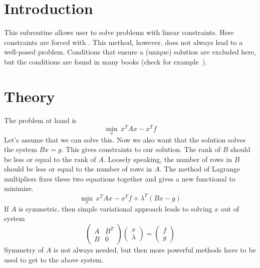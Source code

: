 \noindent
{}
\begin{versiona}

\section{Introduction}
This subroutine allows user to solve problems with linear constraints.
Here constraints are forced with . This method,
however, does not always lead to a well-posed problem. Conditions that ensure
a (unique) solution are excluded here, but the conditions are found in many
books (check for example~\cite{c:girault}).  

\section{Theory}
The problem at hand is
\begin{equation}\label{e:problem}
\min_x \, x^T A x - x^T f
\end{equation}
Let's assume that we can solve this. Now we also want that the solution
solves the system $Bx = g$. This gives constraints to our solution.
The rank of $B$ should be less or equal to the rank of $A$.
Loosely speaking, the number of rows in $B$ should be less or equal to the
number of rows in $A$. The method of Lagrange multipliers fixes these two
equations together and gives a new functional to minimize.
\begin{equation}
\min_x \, x^T A x - x^T f +\lambda^T ( Bx-g )
\end{equation}
If $A$ is symmetric, then simple variational approach leads to solving
$x$ out of system
\begin{equation}
\begin{pmatrix}
A & B^T \\
B & 0 
\end{pmatrix} 
\begin{pmatrix}
x \\
\lambda
\end{pmatrix}
=
\begin{pmatrix}
f \\
g
\end{pmatrix}
\end{equation}
Symmetry of $A$ is not always needed, but then more powerful methods have to be used
to get to the above system.


\end{versiona}
